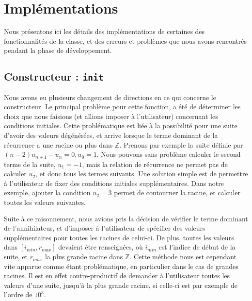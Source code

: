 \documentclass[12pt]{article}
\newlength{\charwidth}
\newcommand{\uline}{\underline{\hspace{2\charwidth}}}
\begin{document}

\section{Implémentations}
    Nous présentons ici les détails des implémentations de certaines des fonctionnalités
    de la classe, et des erreurs et problèmes que nous avons rencontrés pendant la
    phase de développement.
    \subsection{Constructeur : \texttt{\uline init\uline}}
        Nous avons eu plusieurs changement de directions en ce qui concerne le constructeur.
        Le principal problème pour cette fonction, a été de déterminer les choix que nous
        faisions (et allions imposer à l'utilisateur) concernant les conditions initiales.
        Cette problématique est liée à la possibilité pour une suite d'avoir des
        valeurs dégénérées, et arrive lorsque le terme dominant de la récurrence 
        a une racine ou plus dans $\mathbb Z$. Prenons par exemple la suite
        définie par $(n-2)u_{n+1} - u_n = 0, u_0 = 1$. Nous pouvons sans problème calculer
        le second terme de la suite, $u_1 = -1$, mais la relation de récurrence ne permet pas
        de calculer $u_2$, et donc tous les termes suivants.
        Une solution simple est de permettre à l'utilisateur de fixer des conditions initiales
        supplémentaires. Dans notre exemple, ajouter la condition $u_2 = 3$ permet de
        contourner la racine, et calculer toutes les valeurs suivantes.
        \par Suite à ce raisonnement, nous avions pris la décision de vérifier le terme
        dominant de l'annihilateur, et d'imposer à l'utilisateur de spécifier des 
        valeurs supplémentaires pour toutes les racines de celui-ci. De plus,
        toutes les valeurs dans $[i_{min},r_{max}]$ devaient être renseignées,
        où $i_{min}$ est l'indice de début de la suite, et $r_{max}$ la plus grande racine 
        dans $\mathbb Z$. Cette méthode nous est cependant vite apparue comme étant
        problématique, en particulier dans le cas de grandes racines. Il est en effet
        contre-productif de demander à l'utilisateur toutes les valeurs d'une suite,
        jusqu'à la plus grande racine, si celle-ci est par exemple de l'ordre de $10^3$.
\end{document}
